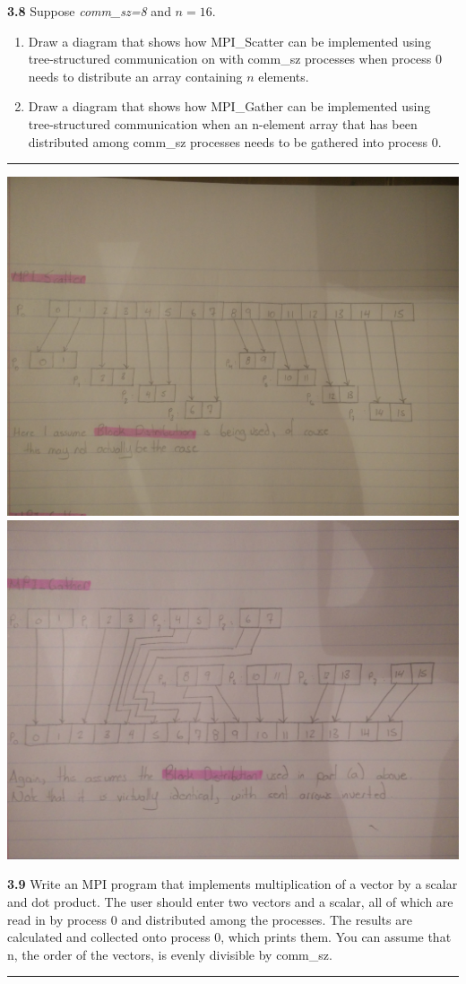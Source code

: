 \documentclass[12pt]{jhwhw}
\begin{document}
\clearpage
\textbf{3.8}
	Suppose \textit{comm\_sz=8} and $n=16$.
	\begin{enumerate}
		\item Draw a diagram that shows how MPI\_Scatter can be implemented using
			tree-structured communication on with comm\_sz processes when process 0
			needs to distribute an array containing $n$ elements.
		\item Draw a diagram that shows how MPI\_Gather can be implemented using 
			tree-structured communication when an n-element array that has been
			distributed among comm\_sz processes needs to be gathered into process 0.
	\end{enumerate}
\textcolor[RGB]{240,240,240}{\rule{\textwidth}{0.5pt}}\bigbreak

\includegraphics[scale=0.12]{MPI_Scatter.jpg}
\includegraphics[scale=0.12]{MPI_Gather.jpg}

\clearpage
\textbf{3.9}
	Write an MPI program that implements multiplication of a vector by a scalar
	and dot product. The user should enter two vectors and a scalar, all of which
	are read in by process 0 and distributed among the processes. The results
	are calculated and collected onto process 0, which prints them.
	You can assume that n, the order of the vectors, is evenly divisible by 
	comm\_sz.
\textcolor[RGB]{240,240,240}{\rule{\textwidth}{0.5pt}}\bigbreak

\inputminted{c}{3.9.c}
\end{document}
